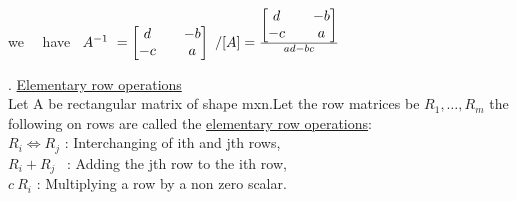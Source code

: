 \documentclass[11pt]{amsbook}
\begin{document}
 
we \ \  have \ $
A^{-1} \ =
	\begin{bmatrix}
		d  &&   -b      \\
		-c  &&   a      \\
	\end{bmatrix} \ 
/[A]  = \frac{
	\begin{bmatrix}
	d  &&   -b      \\
	-c  &&   a      
	\end{bmatrix}}
	{ ad-bc }
\\
$

.  \underline{Elementary row operations}\\
\setlength{\parindent}{7ex} 
\tal Let A be rectangular matrix of shape mxn.Let the row matrices be  $  R_1, \ldots, R_m
$ the following on rows are called  the \underline{elementary row operations}:  \\
\tal $ R_i \Leftrightarrow R_j  $ : Interchanging of ith and jth rows,\\
\tal $ R_i + R_j  $ \ : Adding the jth row to the ith row,\\
\tal $ c \ R_i $ \qquad : Multiplying a row by a non zero scalar.\\
\end{document}
